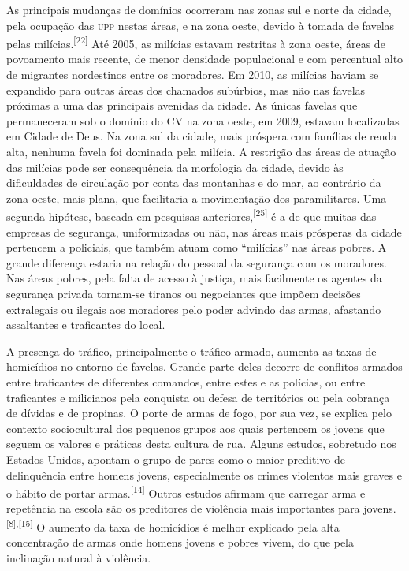 \documentclass{article}
\begin{document}
As principais mudanças de domínios ocorreram nas zonas sul e norte da cidade,
pela ocupação das \textsc{upp} nestas áreas, e na zona oeste, devido à tomada de favelas
pelas milícias.\textsuperscript{[}\textsuperscript{22}\textsuperscript{]}
Até 2005, as milícias estavam restritas à zona oeste, áreas de povoamento mais
recente, de menor densidade populacional e com percentual alto de migrantes
nordestinos entre os moradores. Em 2010, as milícias haviam se expandido para
outras áreas dos chamados subúrbios, mas não nas favelas próximas a uma das
principais avenidas da cidade. As únicas favelas que permaneceram sob o domínio
do CV na zona oeste, em 2009, estavam localizadas em Cidade de Deus. Na zona sul
da cidade, mais próspera com famílias de renda alta, nenhuma favela foi dominada
pela milícia. A restrição das áreas de atuação das milícias pode ser
consequência da morfologia da cidade, devido às dificuldades de circulação por
conta das montanhas e do mar, ao contrário da zona oeste, mais plana, que
facilitaria a movimentação dos paramilitares. Uma segunda hipótese, baseada em
pesquisas anteriores,\textsuperscript{[}\textsuperscript{25}\textsuperscript{]}
é a de que muitas das empresas de segurança, uniformizadas ou não, nas áreas
mais prósperas da cidade pertencem a policiais, que também atuam como “milícias”
nas áreas pobres. A grande diferença estaria na relação do pessoal da segurança
com os moradores. Nas áreas pobres, pela falta de acesso à justiça, mais
facilmente os agentes da segurança privada tornam-se tiranos ou negociantes que
impõem decisões extralegais ou ilegais aos moradores pelo poder advindo das
armas, afastando assaltantes e traficantes do local.

A presença do tráfico, principalmente o tráfico armado, aumenta as taxas de
homicídios no entorno de favelas. Grande parte deles decorre de conflitos
armados entre traficantes de diferentes comandos, entre estes e as polícias, ou
entre traficantes e milicianos pela conquista ou defesa de territórios ou pela
cobrança de dívidas e de propinas. O porte de armas de fogo, por sua vez, se
explica pelo contexto sociocultural dos pequenos grupos aos quais pertencem os
jovens que seguem os valores e práticas desta cultura de rua. Alguns estudos,
sobretudo nos Estados Unidos, apontam o grupo de pares como o maior preditivo de
delinquência entre homens jovens, especialmente os crimes violentos mais graves
e o hábito de portar armas.\textsuperscript{[}\textsuperscript{14}\textsuperscript{]}
Outros estudos afirmam que carregar arma e repetência na escola são os
preditores de violência mais importantes para
jovens.\textsuperscript{[}\textsuperscript{8}\textsuperscript{]}\textsuperscript{,}\textsuperscript{[}\textsuperscript{15}\textsuperscript{]}
O aumento da taxa de homicídios é melhor explicado pela alta concentração de
armas onde homens jovens e pobres vivem, do que pela inclinação natural à
violência.
\end{document}
